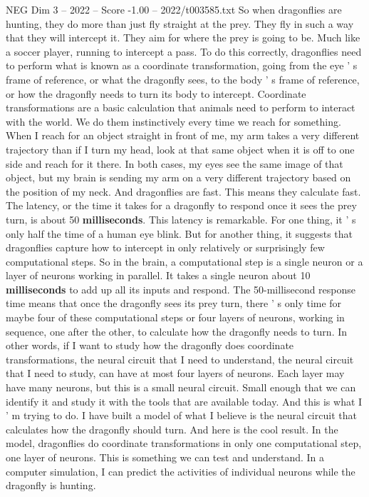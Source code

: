 \begin{textsample}{NEG Dim 3 – 2022 – Score -1.00 – 2022/t003585.txt}
So when dragonflies are hunting, they do more than just fly straight at the prey.
They fly in such a way that they will intercept it.
They aim for where the prey is going to be.
Much like a soccer player, running to intercept a pass.
To do this correctly, dragonflies need to perform what is known as a coordinate transformation, going from the eye ' s frame of reference, or what the dragonfly sees, to the body ' s frame of reference, or how the dragonfly needs to turn its body to intercept.
Coordinate transformations are a basic calculation that animals need to perform to interact with the world.
We do them instinctively every time we reach for something.
When I reach for an object straight in front of me, my arm takes a very different trajectory than if I turn my head, look at that same object when it is off to one side and reach for it there.
In both cases, my eyes see the same image of that object, but my brain is sending my arm on a very different trajectory based on the position of my neck.
And dragonflies are fast.
This means they calculate fast.
The latency, or the time it takes for a dragonfly to respond once it sees the prey turn, is about 50 \textbf{milliseconds}.
This latency is remarkable.
For one thing, it ' s only half the time of a human eye blink.
But for another thing, it suggests that dragonflies capture how to intercept in only relatively or surprisingly few computational steps.
So in the brain, a computational step is a single neuron or a layer of neurons working in parallel.
It takes a single neuron about 10 \textbf{milliseconds} to add up all its inputs and respond.
The 50-millisecond response time means that once the dragonfly sees its prey turn, there ' s only time for maybe four of these computational steps or four layers of neurons, working in sequence, one after the other, to calculate how the dragonfly needs to turn.
In other words, if I want to study how the dragonfly does coordinate transformations, the neural circuit that I need to understand, the neural circuit that I need to study, can have at most four layers of neurons.
Each layer may have many neurons, but this is a small neural circuit.
Small enough that we can identify it and study it with the tools that are available today.
And this is what I ' m trying to do.
I have built a model of what I believe is the neural circuit that calculates how the dragonfly should turn.
And here is the cool result.
In the model, dragonflies do coordinate transformations in only one computational step, one layer of neurons.
This is something we can test and understand.
In a computer simulation, I can predict the activities of individual neurons while the dragonfly is hunting.

\end{textsample}

